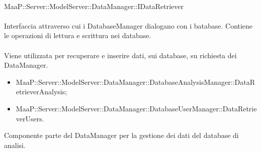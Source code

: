 \\
MaaP::Server::ModelServer::DataManager::IDataRetriever\\
\\
Interfaccia attraverso cui i DatabaseManager dialogano con i batabase. Contiene le operazioni di lettura e scrittura nei database.\\
\\
Viene utilizzata per recuperare e inserire dati, sui database, su richiesta dei DataManager.\\
\begin{itemize}
\item MaaP::Server::ModelServer::DataManager::DatabaseAnalysisManager::DataRetrieverAnalysis;
\item MaaP::Server::ModelServer::DataManager::DatabaseUserManager::DataRetrieverUsers.
\end{itemize}

Componente parte del DataManager per la gestione dei dati del database di analisi.

